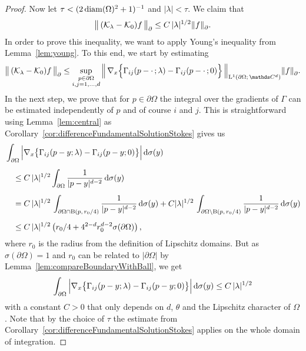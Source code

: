 \begin{proof}
  Now let $\tau < (2 \operatorname{diam}(\Omega)^2 + 1)^{-1}$ and $|\lambda| < \tau$.
  We claim that
  \begin{align*}
  \big\|\, (\mathcal{K}_\lambda - \mathcal{K}_0) f\, \big\|^{}_\partial \leq C \, |\lambda|^{1/2} \|f\|^{}_\partial.
  \end{align*}
  In order to prove this inequality, we want to apply Young's inequality from Lemma~\ref{lem:young}. To this end, we start by estimating
  \begin{align*}
      \big\|\,  (\K_\lambda - \K_0) f\, \big\|^{}_\partial 
    \leq \sup_{\substack {p \in \partial\Omega \\ i,j = 1,\dots,d}} \Big\|\, \nabla_x \Big\{ \Gamma_{ij}(p - \cdot\,; \lambda) - \Gamma_{ij}(p - \cdot\,; 0) \Big\} \, \Big\|_{\Ell^1(\partial\Omega;\,\C^d)} \| f\|_\partial^{}.
  \end{align*}
  In the next step, we prove that for $p \in \partial\Omega$ the integral over the gradients of $\Gamma$ can be estimated independently of $p$ and of course $i$ and $j$.
  This is straightforward using Lemma~\ref{lem:central} as Corollary~\ref{cor:differenceFundamentalSolutionStokes} gives us
  \begin{align*}
    &\int_{\partial\Omega} \Big| \nabla_x \big\{ \Gamma_{ij}(p - y; \lambda) - \Gamma_{ij}(p - y; 0) \big\} \Big| \, {\operatorname{d}\!{\sigma}}(y)\\[0.5em]
      &\quad\leq C \, |\lambda|^{1/2} \int_{\partial\Omega} \frac{1}{|p - y|^{d - 2}} \, {\operatorname{d}\!{\sigma}}(y) \\[0.5em]
      &\quad= C \, |\lambda|^{1/2} \, \int_{\partial\Omega \cap \mathrm{B}(p,\, r_0/4)} \frac{1}{|p - y|^{d - 2}} \, {\operatorname{d}\!{\sigma}}(y) + C |\lambda|^{1/2}\, \int_{\partial\Omega \setminus \mathrm{B}(p,\, r_0/4)} \frac{1}{|p - y|^{d - 2}} \, {\operatorname{d}\!{\sigma}}(y) \\[0.5em]
      &\quad\leq C \, |\lambda|^{1/2} \,\big( r_0/4 + 4^{2 - d} r_0^{d - 2} \sigma( \partial\Omega ) \big)\,,
  \end{align*}
  where $r_0$ is the radius from the definition of Lipschitz domains.
  But as $\sigma( \partial\Omega )  = 1$ and $r_0$ can be related to $|\partial\Omega|$ by Lemma~\ref{lem:compareBoundaryWithBall}, we get
  \begin{align*}
    \int_{\partial\Omega} \Big|\nabla_x \big\{\Gamma_{ij}(p - y; \lambda) - \Gamma_{ij}(p - y; 0) \big\} \Big| \, {\operatorname{d}\!{\sigma}}(y) \leq C \, |\lambda|^{1/2}
  \end{align*}
  with a constant $C > 0$ that only depends on $d$, $\theta$ and the Lipschitz character of $\Omega$.
  Note that by the choice of $\tau$ the estimate from Corollary~\ref{cor:differenceFundamentalSolutionStokes} applies on the whole domain of integration.


\end{proof}
